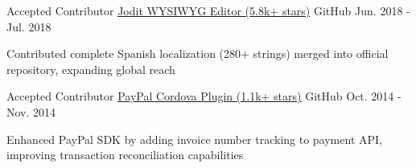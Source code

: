 \begin{cventries}
  \cventry
    {Accepted Contributor} %
    {\href{https://github.com/xdan/jodit}{Jodit WYSIWYG Editor (5.8k+ stars)}} %
    {\faGithubSquare\acvHeaderIconSep GitHub} %
    {Jun. 2018 - Jul. 2018} %
    {
      \begin{cvitems} %
        \item {Contributed complete Spanish localization (280+ strings) merged into official repository, expanding global reach}
      \end{cvitems}
    }

  \cventry
    {Accepted Contributor} %
    {\faPaypal \hphantom{-} \href{https://github.com/paypal/PayPal-Cordova-Plugin}{PayPal Cordova Plugin (1.1k+ stars)}} %
    {\faGithubSquare\acvHeaderIconSep GitHub} %
    {Oct. 2014 - Nov. 2014} %
    {
      \begin{cvitems} %
        \item {Enhanced PayPal SDK by adding invoice number tracking to payment API, improving transaction reconciliation capabilities}
      \end{cvitems}
    }

\end{cventries}
